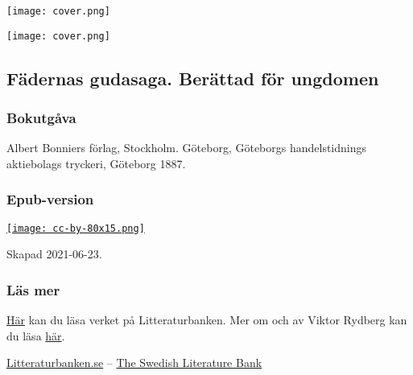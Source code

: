 \texttt{[image: cover.png]}

\protect\hypertarget{cover.xhtml}{}{}

\texttt{[image: cover.png]}

\protect\hypertarget{littb-kolofon.xhtml}{}{}

\subsection{Fädernas gudasaga. Berättad för ungdomen}

\subsubsection{Bokutgåva}

{Albert Bonniers förlag, Stockholm. Göteborg, Göteborgs handelstidnings
aktiebolags tryckeri, Göteborg 1887. }

\subsubsection{Epub-version}

\href{https://creativecommons.org/licenses/by/4.0/}{\texttt{[image: cc-by-80x15.png]}}

Skapad 2021-06-23.

\subsubsection{Läs mer}

\href{http://litteraturbanken.se/forfattare/RydbergV/titlar/FadernasGudasaga/etext}{Här}
kan du läsa verket på Litteraturbanken. Mer om och av Viktor Rydberg kan
du läsa \href{http://litteraturbanken.se/forfattare/RydbergV}{här}.

\href{http://litteraturbanken.se/}{Litteraturbanken.se} --
\href{http://litteraturbanken.se/om/inenglish/}{The Swedish Literature
Bank}

\protect\hypertarget{lb1625905.xhtml}{}{}

\protect\hypertarget{lb1625905.xhtmlux5cux23startI}{}{}\protect\hypertarget{lb1625905.xhtmlux5cux23startI-a}{}{}\protect\hypertarget{lb1625905.xhtmlux5cux23startI-b}{}{}\protect\hypertarget{lb1625905.xhtmlux5cux23startI-c}{}{}\protect\hypertarget{lb1625905.xhtmlux5cux23startI-d}{}{}
\protect\hypertarget{lb1625905.xhtmlux5cux23startII}{}{}\protect\hypertarget{lb1625905.xhtmlux5cux23startII-a}{}{}\protect\hypertarget{lb1625905.xhtmlux5cux23startII-b}{}{}\protect\hypertarget{lb1625905.xhtmlux5cux23startII-c}{}{}\protect\hypertarget{lb1625905.xhtmlux5cux23startII-d}{}{}

